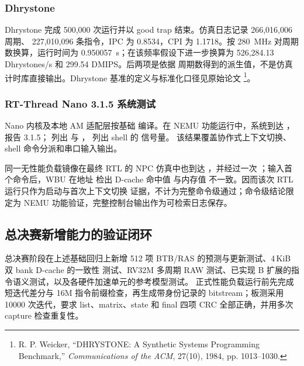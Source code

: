 \subsubsection{Dhrystone}

Dhrystone 完成 500,000 次运行并以 good trap 结束。仿真日志记录 266,016,006 周期、
227,010,096 条指令，IPC 为 0.8534，CPI 为 1.1718。按 280~MHz 对周期数换算，运行时间为
0.950057~s；在该频率假设下进一步换算为 526,284.13 Dhrystones/s 和 299.54 DMIPS。后两项是依据
周期数得到的派生值，不是仿真计时库直接输出。Dhrystone 基准的定义与标准化口径见原始论文
\footnote{R. P. Weicker, ``DHRYSTONE: A Synthetic Systems Programming Benchmark,''
\emph{Communications of the ACM}, 27(10), 1984, pp. 1013--1030.}。

\subsubsection{RT-Thread Nano 3.1.5 系统测试}

Nano 内核及本地 AM 适配层按基础  编译。在 NEMU 功能运行中，系统到达
， 报告 3.1.5； 列出  与
， 列出 shell 的  信号量。
该结果覆盖协作式上下文切换、shell 命令分派和串口输入输出。

同一无性能负载镜像在最终 RTL 的 NPC 仿真中也到达 ，并经过一次
；输入首个命令后，WBU 在地址  检出 D-cache 命中值
 与内存值  不一致。因而该次 RTL 运行只作为启动与首次上下文切换
证据，不计为完整命令级通过；命令级结论限定为 NEMU 功能验证，完整控制台输出作为可检索日志保存。

\subsection{总决赛新增能力的验证闭环}

总决赛阶段在上述基础回归上新增 512 项 BTB/RAS 的预测与更新测试、4\,KiB 双 bank D-cache 的一致性
测试、RV32M 多周期 RAW 测试、已实现 B 扩展的指令语义测试，以及各硬件加速单元的参考模型测试。
正式性能负载运行前先完成短迭代差分与 16M 指令前缀检查，再生成带身份记录的 bitstream；板测采用
10000 次迭代，要求 list、matrix、state 和 final 四项 CRC 全部正确，并用多次 capture 检查重复性。

